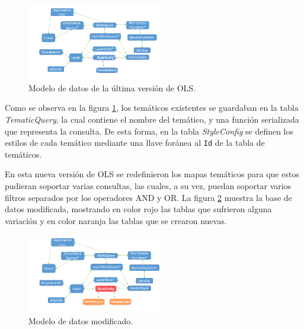 \begin{figure} 
\vspace{-20pt} 
\begin{center} 
\includegraphics[width=0.53\textwidth]{images/merViejo.png} 
\end{center} \vspace{-20pt} \caption{Modelo de datos de la \'ultima versi\'on de OLS.} \label{merViejo} \vspace{-10pt} 
\end{figure}

Como se observa en la figura \ref{merViejo}, los tem\'aticos existentes se guardaban en la tabla \textit{TematicQuery}, la cual contiene el nombre del tem\'atico, y una funci\'on serializada que representa la consulta. De esta forma, en la tabla \textit{StyleConfig} se definen los estilos de cada tem\'atico mediante una llave for\'anea al \texttt{Id} de la tabla de tem\'aticos. 

En esta nueva versi\'on de OLS se redefinieron los mapas tem\'aticos para que estos pudieran soportar varias consultas, las cuales, a su vez, puedan soportar varios filtros separados por los operadores AND y OR. La figura \ref{merNuevo} muestra la base de datos modificada, mostrando en color rojo las tablas que sufrieron alguna variaci\'on y en color naranja las tablas que se crearon nuevas. 

\begin{figure} 
\vspace{-20pt} 
\begin{center} 
\includegraphics[width=0.53\textwidth]{images/merNuevo.png} 
\end{center} \vspace{-20pt} \caption{Modelo de datos modificado.} \label{merNuevo} \vspace{-10pt} 
\end{figure}

